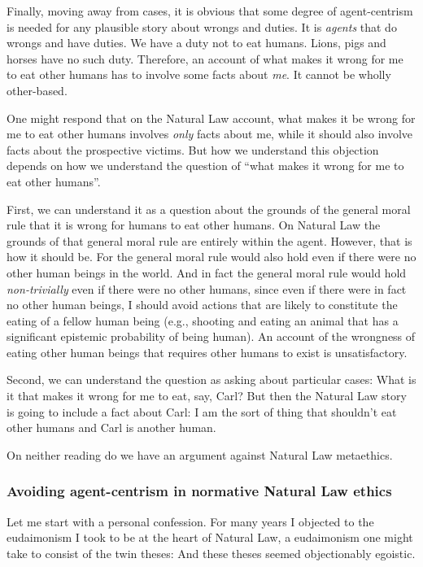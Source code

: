 Finally, moving away from cases, it is obvious that some degree of agent-centrism is needed for any plausible story about wrongs 
and duties. It is \textit{agents} that do wrongs and have duties. We have a duty not to eat humans. Lions, pigs and horses have no 
such  duty. Therefore, an account of what makes it wrong for me to eat other humans has to involve some facts about \textit{me}.
It cannot be wholly other-based. 

One might respond that on the Natural Law account, what makes it be wrong for me to eat other humans involves \textit{only} facts
about me, while it should also involve facts about the prospective victims. But how we understand this objection depends on how 
we understand the question of ``what makes it wrong for me to eat other humans''. 

First, we can understand it as a question about the grounds of 
the general moral rule that it is wrong for humans to eat other humans. On Natural Law the grounds of that general moral rule 
are entirely within the agent. However, that is how it should be. For the general moral rule would also hold even if there were
no other human beings in the world. And in fact the general moral rule would hold \textit{non-trivially} even if there were no
other humans, since even if there were in fact no other human beings, I should avoid actions that are likely to constitute the eating
of a fellow human being (e.g., shooting and eating an animal that has a significant epistemic probability of being human). 
An account of the wrongness of eating other human beings that requires other humans to exist is unsatisfactory.

Second, we can understand the question as asking about particular cases: What is it that makes it wrong for me to eat, say, Carl?
But then the Natural Law story is going to include a fact about Carl: I am the sort of thing that shouldn't eat other humans 
and Carl is another human. 

On neither reading do we have an argument against Natural Law metaethics.

\subsubsection{Avoiding agent-centrism in normative Natural Law ethics}
Let me start with a personal confession. For many years I objected to the eudaimonism I took to be at the heart of Natural
Law, a eudaimonism one might take to consist of the twin theses:
And these theses seemed objectionably egoistic.

